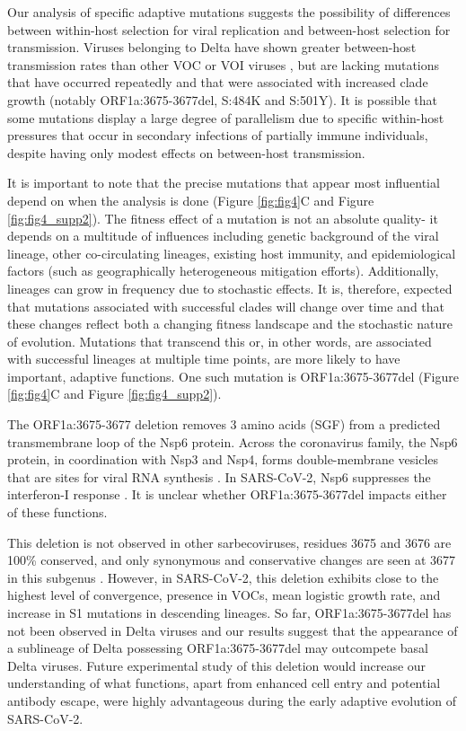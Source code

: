 \documentclass[12pt, letterpaper]{article}
\begin{document}
Our analysis of specific adaptive mutations suggests the possibility of differences between within-host selection for viral replication and between-host selection for transmission. Viruses belonging to Delta have shown greater between-host transmission rates than other VOC or VOI viruses \citep{Campbell2021-cx}, but are lacking mutations that have occurred repeatedly and that were associated with increased clade growth (notably ORF1a:3675-3677del, S:484K and S:501Y). It is possible that some mutations display a large degree of parallelism due to specific within-host pressures that occur in secondary infections of partially immune individuals, despite having only modest effects on between-host transmission.

It is important to note that the precise mutations that appear most influential depend on when the analysis is done (Figure \ref{fig:fig4}C and Figure \ref{fig:fig4_supp2}). The fitness effect of a mutation is not an absolute quality- it depends on a multitude of influences including genetic background of the viral lineage, other co-circulating lineages, existing host immunity, and epidemiological factors (such as geographically heterogeneous mitigation efforts). Additionally, lineages can grow in frequency due to stochastic effects. It is, therefore, expected that mutations associated with successful clades will change over time and that these changes reflect both a changing fitness landscape and the stochastic nature of evolution. Mutations that transcend this or, in other words, are associated with successful lineages at multiple time points, are more likely to have important, adaptive functions. One such mutation is ORF1a:3675-3677del (Figure \ref{fig:fig4}C and Figure \ref{fig:fig4_supp2}).

The ORF1a:3675-3677 deletion removes 3 amino acids (SGF) from a predicted transmembrane loop \citep{Benvenuto2020-uc} of the Nsp6 protein. Across the coronavirus family, the Nsp6 protein, in coordination with Nsp3 and Nsp4, forms double-membrane vesicles that are sites for viral RNA synthesis \citep{Snijder2020-vx}. In SARS-CoV-2, Nsp6 suppresses the interferon-I response \citep{Xia2020-zs}. It is unclear whether ORF1a:3675-3677del impacts either of these functions.

This deletion is not observed in other sarbecoviruses, residues 3675 and 3676 are 100\% conserved, and only synonymous and conservative changes are seen at 3677 in this subgenus \citep{Jungreis2021-vv}. However, in SARS-CoV-2, this deletion exhibits close to the highest level of convergence, presence in VOCs, mean logistic growth rate, and increase in S1 mutations in descending lineages. So far, ORF1a:3675-3677del has not been observed in Delta viruses and our results suggest that the appearance of a sublineage of Delta possessing ORF1a:3675-3677del may outcompete basal Delta viruses. Future experimental study of this deletion would increase our understanding of what functions, apart from enhanced cell entry and potential antibody escape, were highly advantageous during the early adaptive evolution of SARS-CoV-2.
\end{document}
